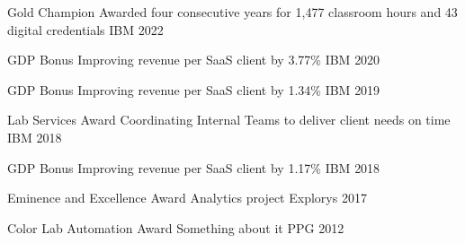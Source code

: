 

\begin{cvhonors}

  \cvhonor
    {Gold Champion} %
    {Awarded four consecutive years for 1,477 classroom hours and 43 digital credentials} %
    {IBM} %
    {2022} %

  \cvhonor
    {GDP Bonus} %
    {Improving revenue per SaaS client by 3.77\%} %
    {IBM} %
    {2020} %

  \cvhonor
    {GDP Bonus} %
    {Improving revenue per SaaS client by 1.34\%} %
    {IBM} %
    {2019} %

  \cvhonor
    {Lab Services Award} %
    {Coordinating Internal Teams to deliver client needs on time} %
    {IBM} %
    {2018} %

  \cvhonor
    {GDP Bonus} %
    {Improving revenue per SaaS client by 1.17\%} %
    {IBM} %
    {2018} %

  \cvhonor
    {Eminence and Excellence Award} %
    {Analytics project} %
    {Explorys} %
    {2017} %

  \cvhonor
    {Color Lab Automation Award} %
    {Something about it} %
    {PPG} %
    {2012} %

\end{cvhonors}
